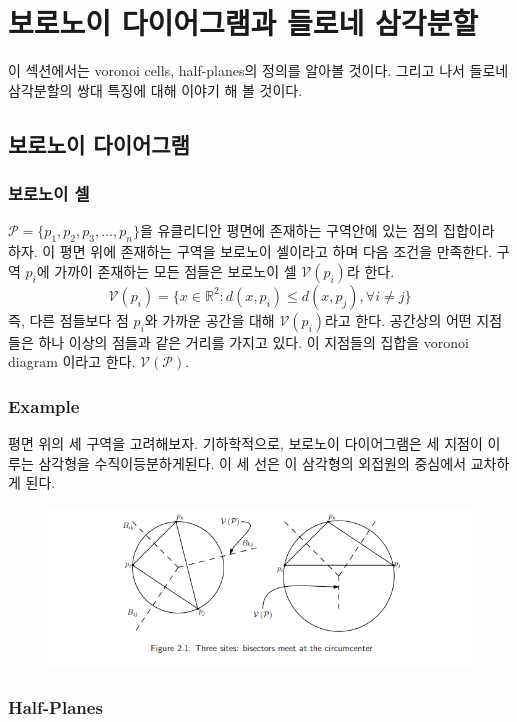 \documentclass{article}
\begin{document}
\section{보로노이 다이어그램과 들로네 삼각분할}
이 섹션에서는 voronoi cells, half-planes의 정의를 알아볼 것이다. 
그리고 나서 들로네 삼각분할의 쌍대 특징에 대해 이야기 해 볼 것이다. 
\subsection{보로노이 다이어그램}  
\subsubsection{보로노이 셀}
$\mathcal{P} = \{ p_1, p_2, p_3, ... , p_n \} $을 유클리디안 평면에 존재하는 
구역안에 있는 점의 집합이라 하자. 이 평면 위에 존재하는 구역을 보로노이 셀이라고 하며 
다음 조건을 만족한다. 구역 $p_i$에 가까이 존재하는 모든 점들은 보로노이 셀 
$\mathcal{V}(p_i)$라 한다. 
\[
    \mathcal{V}(p_i) = \{x \in \mathbb{R}^2:d(x, p_i) \le d(x, p_j), \forall i \ne j \}
\]
즉, 다른 점들보다 점 $p_i$와 가까운 공간을 대해 $\mathcal{V}(p_i)$라고 한다. 
공간상의 어떤 지점들은 하나 이상의 점들과 같은 거리를 가지고 있다. 이 지점들의 집합을 
voronoi diagram 이라고 한다. $\mathcal{V}(\mathcal{P})$. 

\subsubsection{Example}

평면 위의 세 구역을 고려해보자. 기하학적으로, 보로노이 다이어그램은 세 지점이 이루는 
삼각형을 수직이등분하게된다. 이 세 선은 이 삼각형의 외접원의 중심에서 교차하게 된다. 

\begin{figure}[h]
    \includegraphics{capture.PNG}
\end{figure}

\subsubsection{Half-Planes}
\end{document}
